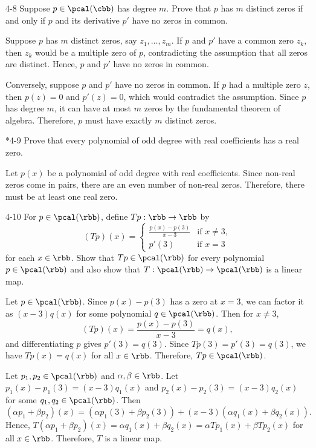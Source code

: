 \begin{exercise}{4-8}
    Suppose $p \in \pcal(\cbb)$ has degree $m$.
	Prove that $p$ has $m$ distinct zeros if and only if $p$ and its derivative $p'$ have no zeros in common.
\end{exercise}

\begin{sol}
    Suppose $p$ has $m$ distinct zeros, say $z_1, \ldots, z_m$.
	If $p$ and $p'$ have a common zero $z_k$, then $z_k$ would be a multiple zero of $p$, contradicting the assumption that all zeros are distinct.
	Hence, $p$ and $p'$ have no zeros in common.

    Conversely, suppose $p$ and $p'$ have no zeros in common.
	If $p$ had a multiple zero $z$, then $p(z) = 0$ and $p'(z) = 0$, which would contradict the assumption.
	Since $p$ has degree $m$, it can have at most $m$ zeros by the fundamental theorem of algebra.
    Therefore, $p$ must have exactly $m$ distinct zeros.
\end{sol}

\begin{exercise}*{4-9}
    Prove that every polynomial of odd degree with real coefficients has a real zero.
\end{exercise}

\begin{sol}
    Let $p(x)$ be a polynomial of odd degree with real coefficients.
	Since non-real zeros come in pairs, there are an even number of non-real zeros.
	Therefore, there must be at least one real zero.
\end{sol}

\begin{exercise}{4-10}
    For $p \in \pcal(\rbb)$, define $Tp: \rbb \to \rbb$ by
    \[
        (Tp)(x) =
        \begin{cases}
            \frac{p(x) - p(3)}{x - 3} & \text{if } x \neq 3, \\
            p'(3) & \text{if } x = 3
        \end{cases}
    \]
    for each $x \in \rbb$.
	Show that $Tp \in \pcal(\rbb)$ for every polynomial $p \in \pcal(\rbb)$ and also show that $T: \pcal(\rbb) \to \pcal(\rbb)$ is a linear map.
\end{exercise}

\begin{sol}
    Let $p \in \pcal(\rbb)$.
	Since $p(x) - p(3)$ has a zero at $x = 3$, we can factor it as $(x - 3)q(x)$ for some polynomial $q \in \pcal(\rbb)$.
	Then for $x \neq 3$,
    \[
    	(Tp)(x) = \frac{p(x) - p(3)}{x - 3} = q(x),
    \]
    and differentiating $p$ gives $p'(3) = q(3)$.
	Since $Tp(3) = p'(3) = q(3)$, we have $Tp(x) = q(x)$ for all $x \in \rbb$.
	Therefore, $Tp \in \pcal(\rbb)$.

    Let $p_1, p_2 \in \pcal(\rbb)$ and $\alpha, \beta \in \rbb$.
	Let $p_1(x) - p_1(3) = (x - 3)q_1(x)$ and $p_2(x) - p_2(3) = (x - 3)q_2(x)$ for some $q_1, q_2 \in \pcal(\rbb)$.
	Then
    \[
    	(\alpha p_1 + \beta p_2)(x) = (\alpha p_1(3) + \beta p_2(3)) + (x - 3)(\alpha q_1(x) + \beta q_2(x)).
    \]
    Hence, $T(\alpha p_1 + \beta p_2)(x) = \alpha q_1(x) + \beta q_2(x) = \alpha Tp_1(x) + \beta Tp_2(x)$ for all $x \in \rbb$.
	Therefore, $T$ is a linear map.
\end{sol}

